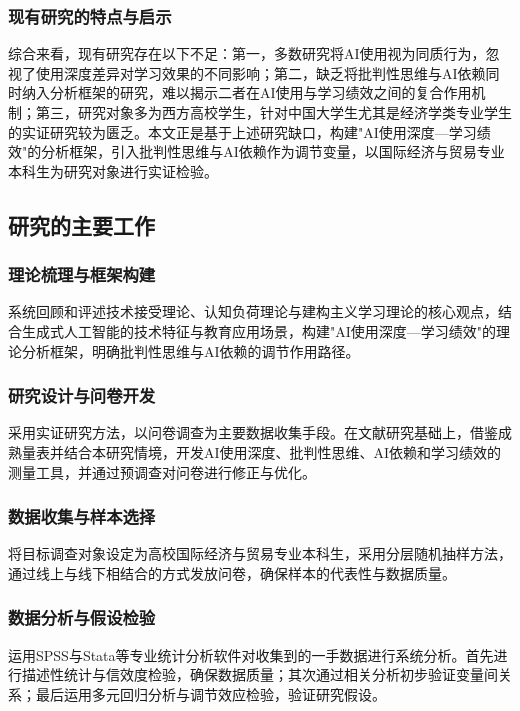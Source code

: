 \documentclass{njtech-thesis}
\begin{document}
\subsubsection{现有研究的特点与启示}

综合来看，现有研究存在以下不足：第一，多数研究将AI使用视为同质行为，忽视了使用深度差异对学习效果的不同影响；第二，缺乏将批判性思维与AI依赖同时纳入分析框架的研究，难以揭示二者在AI使用与学习绩效之间的复合作用机制；第三，研究对象多为西方高校学生，针对中国大学生尤其是经济学类专业学生的实证研究较为匮乏。本文正是基于上述研究缺口，构建"AI使用深度—学习绩效"的分析框架，引入批判性思维与AI依赖作为调节变量，以国际经济与贸易专业本科生为研究对象进行实证检验。

\subsection{研究的主要工作}

\subsubsection{理论梳理与框架构建}

系统回顾和评述技术接受理论、认知负荷理论与建构主义学习理论的核心观点，结合生成式人工智能的技术特征与教育应用场景，构建"AI使用深度—学习绩效"的理论分析框架，明确批判性思维与AI依赖的调节作用路径。

\subsubsection{研究设计与问卷开发}

采用实证研究方法，以问卷调查为主要数据收集手段。在文献研究基础上，借鉴成熟量表并结合本研究情境，开发AI使用深度、批判性思维、AI依赖和学习绩效的测量工具，并通过预调查对问卷进行修正与优化。

\subsubsection{数据收集与样本选择}

将目标调查对象设定为高校国际经济与贸易专业本科生，采用分层随机抽样方法，通过线上与线下相结合的方式发放问卷，确保样本的代表性与数据质量。

\subsubsection{数据分析与假设检验}

运用SPSS与Stata等专业统计分析软件对收集到的一手数据进行系统分析。首先进行描述性统计与信效度检验，确保数据质量；其次通过相关分析初步验证变量间关系；最后运用多元回归分析与调节效应检验，验证研究假设。
\end{document}
